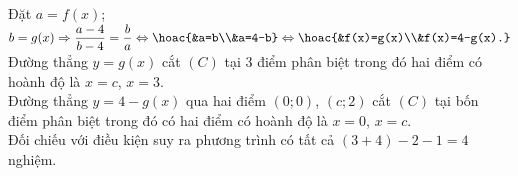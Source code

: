 \begin{ex}
{\begin{center}
		\end{center}
		Đặt $a=f(x)$; $b=g(x)\Rightarrow \dfrac{a-4}{b-4}=\dfrac{b}{a}\Leftrightarrow \hoac{&a=b\\&a=4-b}\Leftrightarrow \hoac{&f(x)=g(x)\\&f(x)=4-g(x).}$\\
		Đường thẳng $y=g(x)$ cắt $(C)$ tại $3$ điểm phân biệt trong đó hai điểm có hoành độ là $x=c$, $x=3$.\\
		Đường thẳng $y=4-g(x)$ qua hai điểm $(0;0)$, $(c;2)$ cắt $(C)$ tại bốn điểm phân biệt trong đó có hai điểm có hoành độ là $x=0$, $x=c$.\\
		Đối chiếu với điều kiện suy ra phương trình có tất cả $(3+4)-2-1=4$ nghiệm. 
	}
\end{ex}


